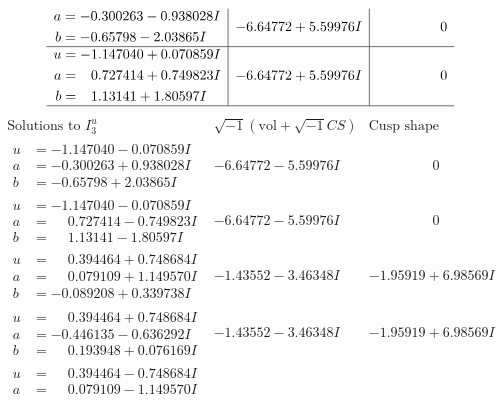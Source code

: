 \documentclass[1p]{elsarticle_modified}
\theoremstyle{definition}
\newcommand{\I}{\sqrt{-1}}
\begin{document}
$$\begin{array}{c|c|c}
\begin{aligned}
a &= -0.300263 - 0.938028 I \\
b &= -0.65798 - 2.03865 I\end{aligned}
 & -6.64772 + 5.59976 I & \phantom{-0.000000 } 0 \\ \hline\begin{aligned}
u &= -1.147040 + 0.070859 I \\
a &= \phantom{-}0.727414 + 0.749823 I \\
b &= \phantom{-}1.13141 + 1.80597 I\end{aligned}
 & -6.64772 + 5.59976 I & \phantom{-0.000000 } 0\\
 \hline 
 \end{array}$$\newpage$$\begin{array}{c|c|c}  
\text{Solutions to }I^u_{3}& \I (\text{vol} + \sqrt{-1}CS) & \text{Cusp shape}\\
 \hline 
\begin{aligned}
u &= -1.147040 - 0.070859 I \\
a &= -0.300263 + 0.938028 I \\
b &= -0.65798 + 2.03865 I\end{aligned}
 & -6.64772 - 5.59976 I & \phantom{-0.000000 } 0 \\ \hline\begin{aligned}
u &= -1.147040 - 0.070859 I \\
a &= \phantom{-}0.727414 - 0.749823 I \\
b &= \phantom{-}1.13141 - 1.80597 I\end{aligned}
 & -6.64772 - 5.59976 I & \phantom{-0.000000 } 0 \\ \hline\begin{aligned}
u &= \phantom{-}0.394464 + 0.748684 I \\
a &= \phantom{-}0.079109 + 1.149570 I \\
b &= -0.089208 + 0.339738 I\end{aligned}
 & -1.43552 - 3.46348 I & -1.95919 + 6.98569 I \\ \hline\begin{aligned}
u &= \phantom{-}0.394464 + 0.748684 I \\
a &= -0.446135 - 0.636292 I \\
b &= \phantom{-}0.193948 + 0.076169 I\end{aligned}
 & -1.43552 - 3.46348 I & -1.95919 + 6.98569 I \\ \hline\begin{aligned}
u &= \phantom{-}0.394464 - 0.748684 I \\
a &= \phantom{-}0.079109 - 1.149570 I \\

\end{aligned}
\end{array}$$
\end{document}

